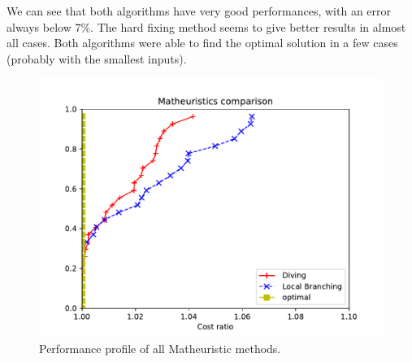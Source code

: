 We can see that both algorithms have very good performances, with an error always below 7\%. The hard fixing method seems to give better results in almost all cases.
Both algorithms were able to find the optimal solution in a few cases (probably with the smallest inputs).

\begin{figure}[H]
    \centering
    \includegraphics[width=0.7\linewidth]{Immagini/math.pdf}
    \caption{Performance profile of all Matheuristic methods.}
    \label{fig:math_comp}
\end{figure}